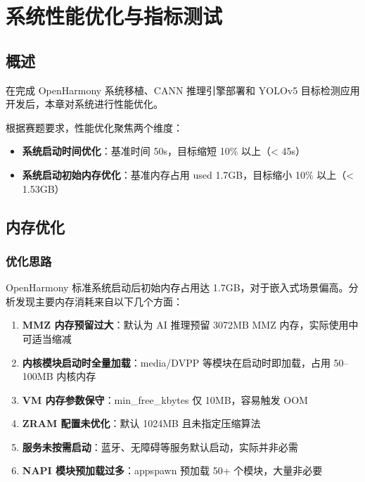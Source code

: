 
\chapter{系统性能优化与指标测试}

\section{概述}

在完成 OpenHarmony 系统移植、CANN 推理引擎部署和 YOLOv5 目标检测应用开发后，本章对系统进行性能优化。

根据赛题要求，性能优化聚焦两个维度：

\begin{itemize}
  \item \textbf{系统启动时间优化}：基准时间 50s，目标缩短 10\% 以上（< 45s）
  \item \textbf{系统启动初始内存优化}：基准内存占用 used 1.7GB，目标缩小 10\% 以上（< 1.53GB）
\end{itemize}


\section{内存优化}

\subsection{优化思路}

OpenHarmony 标准系统启动后初始内存占用达 1.7GB，对于嵌入式场景偏高。分析发现主要内存消耗来自以下几个方面：

\begin{enumerate}
  \item \textbf{MMZ 内存预留过大}：默认为 AI 推理预留 3072MB MMZ 内存，实际使用中可适当缩减
  \item \textbf{内核模块启动时全量加载}：media/DVPP 等模块在启动时即加载，占用 50--100MB 内核内存
  \item \textbf{VM 内存参数保守}：min\_free\_kbytes 仅 10MB，容易触发 OOM
  \item \textbf{ZRAM 配置未优化}：默认 1024MB 且未指定压缩算法
  \item \textbf{服务未按需启动}：蓝牙、无障碍等服务默认启动，实际并非必需
  \item \textbf{NAPI 模块预加载过多}：appspawn 预加载 50+ 个模块，大量非必要
\end{enumerate}

